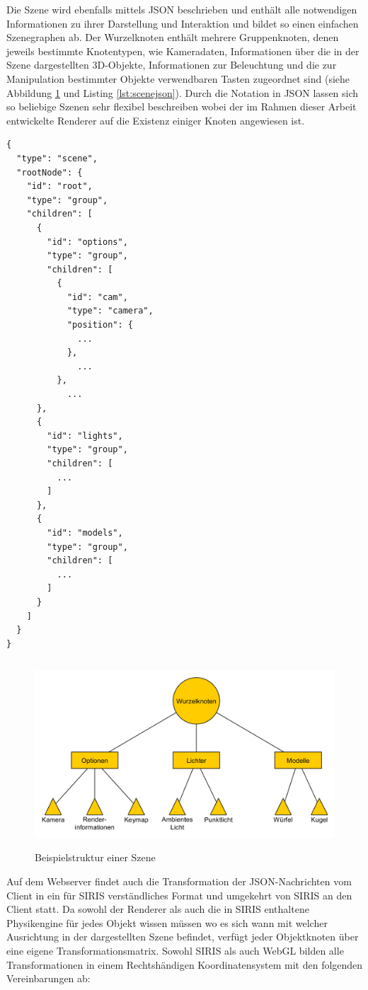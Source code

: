 Die Szene wird ebenfalls mittels JSON beschrieben und enthält alle notwendigen Informationen zu ihrer Darstellung und Interaktion und bildet so einen einfachen Szenegraphen ab. Der Wurzelknoten enthält mehrere Gruppenknoten, denen jeweils bestimmte Knotentypen, wie Kameradaten, Informationen über die in der Szene dargestellten 3D-Objekte, Informationen zur Beleuchtung und die zur Manipulation bestimmter Objekte verwendbaren Tasten zugeordnet sind (siehe Abbildung \ref{fig:szenestruktur} und Listing \ref{lst:scenejson}). Durch die Notation in JSON lassen sich so beliebige Szenen sehr flexibel beschreiben wobei der im Rahmen dieser Arbeit entwickelte Renderer auf die Existenz einiger Knoten angewiesen ist.
\lstset{language=JavaScript}
\begin{lstlisting}[caption={JSON-Struktur einer möglichen Szene}, label={lst:scenejson}]
{
  "type": "scene",
  "rootNode": {
    "id": "root",
    "type": "group",
    "children": [
      {
        "id": "options",
        "type": "group",
        "children": [
          {
            "id": "cam",
            "type": "camera",
            "position": {
              ...
            },
              ...
          },
            ...
      },
      {
        "id": "lights",
        "type": "group",
        "children": [
          ...
        ]
      },
      {
        "id": "models",
        "type": "group",
        "children": [
          ...
        ]
      }
    ]
  }
}
\end{lstlisting}
\begin{figure}
\centering
\includegraphics[height=70mm]{bilder/scenestructure.png}
\caption{Beispielstruktur einer Szene}
\label{fig:szenestruktur}
\end{figure}
Auf dem Webserver findet auch die Transformation der JSON-Nachrichten vom Client in ein für SIRIS verständliches Format und umgekehrt von SIRIS an den Client statt. Da sowohl der Renderer als auch die in SIRIS enthaltene Physikengine für jedes Objekt wissen müssen wo es sich wann mit welcher Ausrichtung in der dargestellten Szene befindet, verfügt jeder Objektknoten über eine eigene Transformationsmatrix. Sowohl SIRIS als auch WebGL bilden alle Transformationen in einem Rechtshändigen Koordinatensystem mit den folgenden Vereinbarungen ab:
